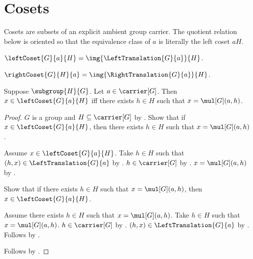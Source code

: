 



\section{Cosets}

Cosets are subsets of an explicit ambient group carrier.  The quotient
relation below is oriented so that the equivalence class of $a$ is literally
the left coset $aH$.

\begin{definition}\label{left_coset}
    $\leftCoset{G}{a}{H}=\img{\LeftTranslation{G}{a}}{H}$.
\end{definition}

\begin{definition}\label{right_coset}
    $\rightCoset{G}{H}{a}=\img{\RightTranslation{G}{a}}{H}$.
\end{definition}

\begin{proposition}\label{left_coset_iff}
    Suppose $\subgroup{H}{G}$.
    Let $a\in\carrier[G]$.
    Then $x\in\leftCoset{G}{a}{H}$ iff
        there exists $h\in H$ such that $x=\mul[G](a,h)$.
\end{proposition}
\begin{proof}
    $G$ is a group and $H\subseteq\carrier[G]$ by
        .
    Show that if $x\in\leftCoset{G}{a}{H}$, then
        there exists $h\in H$ such that $x=\mul[G](a,h)$.
    \begin{subproof}
        Assume $x\in\leftCoset{G}{a}{H}$.
        Take $h\in H$ such that
            $(h,x)\in\LeftTranslation{G}{a}$ by
            .
        $h\in\carrier[G]$ by .
        $x=\mul[G](a,h)$ by .
    \end{subproof}
    Show that if there exists $h\in H$ such that
        $x=\mul[G](a,h)$, then $x\in\leftCoset{G}{a}{H}$.
    \begin{subproof}
        Assume there exists $h\in H$ such that $x=\mul[G](a,h)$.
        Take $h\in H$ such that $x=\mul[G](a,h)$.
        $h\in\carrier[G]$ by .
        $(h,x)\in\LeftTranslation{G}{a}$ by
            .
        Follows by .
    \end{subproof}
    Follows by \auto.
\end{proof}

